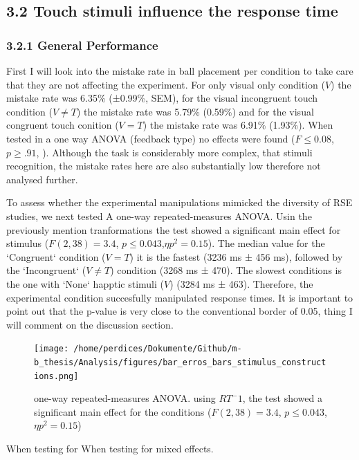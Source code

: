 \documentclass[12pt,oneside,openright]{report}
\begin{document}
    
\subsection*{3.2 Touch stimuli influence the response time}
\subsubsection*{3.2.1 General Performance}

First I will look into the mistake rate in ball placement per condition to take care that they are not affecting the experiment. For only visual only condition ($V$) the mistake rate was 6.35\% (±0.99\%, SEM), for the visual incongruent touch condition ($V \neq T$) the mistake rate was 5.79\% (0.59\%) and for the visual congruent touch conition ($V=T$) the mistake rate was 6.91\% (1.93\%). When tested in a one way  ANOVA (feedback type) no effects were found ($ F \leq0.08$, $p\geq.91 $, ). Although the task is considerably more complex, that stimuli recognition, the mistake rates here are also substantially low therefore not analysed further. 

To assess whether the experimental manipulations mimicked the diversity of RSE studies, we next tested A one-way repeated-measures ANOVA. Usin the previously mention tranformations the test showed a significant main effect for stimulus ($F(2,38) = 3.4$, $p\leq0.043 $,$\eta p^2 =0.15$). The  median value for the `Congruent` condition ($V=T$)  it is the fastest (3236 ms ± 456 ms), followed by the `Incongruent` ($V \neq T$) condition (3268 ms ± 470). The slowest conditions is the one with `None` happtic stimuli ($V$) (3284 ms ± 463). Therefore, the experimental condition succesfully manipulated response times. It is important to point out that the p-value is very close to the conventional border of 0.05, thing I will comment on the discussion section.

\begin{figure}[!ht]
    \centering
    \texttt{[image: /home/perdices/Dokumente/Github/m-b\_thesis/Analysis/figures/bar\_erros\_bars\_stimulus\_constructions.png]}
    \caption{one-way repeated-measures ANOVA. using $RT^-1$, the test showed a significant main effect for the conditions ($F(2,38) = 3.4$, $p\leq0.043 $,$\eta p^2 =0.15$)}
    \label{fig:mesh2}
\end{figure}
When testing for 
When testing for mixed effects.
\end{document}
